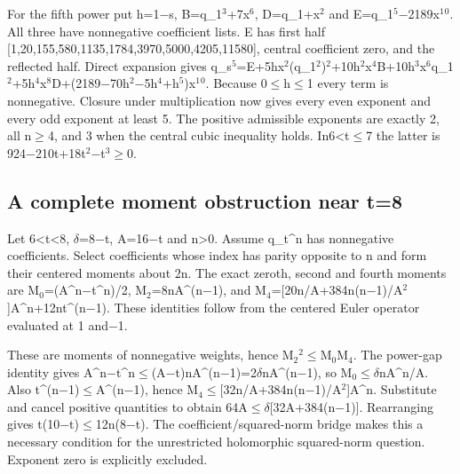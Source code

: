 \documentclass[11pt,a4paper]{article}
\begin{document}
For the fifth power put h=1\ensuremath{-}s, B=q\_1\ensuremath{^3}+7x\ensuremath{^6}, D=q\_1+x\ensuremath{^2} and E=q\_1\ensuremath{^5}\ensuremath{-}2189x\ensuremath{^1}\ensuremath{^0}. All three have nonnegative coefficient lists. E has first half [1,20,155,580,1135,1784,3970,5000,4205,11580], central coefficient zero, and the reflected half. Direct expansion gives q\_s\ensuremath{^5}=E+5hx\ensuremath{^2}(q\_1\ensuremath{^2})\ensuremath{^2}+10h\ensuremath{^2}x\ensuremath{^4}B+10h\ensuremath{^3}x\ensuremath{^6}q\_1\ensuremath{^2}+5h\ensuremath{^4}x\ensuremath{^8}D+(2189\ensuremath{-}70h\ensuremath{^2}\ensuremath{-}5h\ensuremath{^4}+h\ensuremath{^5})x\ensuremath{^1}\ensuremath{^0}. Because 0\ensuremath{\leq}h\ensuremath{\leq}1 every term is nonnegative. Closure under multiplication now gives every even exponent and every odd exponent at least 5. The positive admissible exponents are exactly 2, all n\ensuremath{\geq}4, and 3 when the central cubic inequality holds. In6<t\ensuremath{\leq}7 the latter is 924\ensuremath{-}210t+18t\ensuremath{^2}\ensuremath{-}t\ensuremath{^3}\ensuremath{\geq}0.

\subsection{A complete moment obstruction near t=8}
Let 6<t<8, \ensuremath{\delta}=8\ensuremath{-}t, A=16\ensuremath{-}t and n>0. Assume q\_t\textasciicircum{}n has nonnegative coefficients. Select coefficients whose index has parity opposite to n and form their centered moments about 2n. The exact zeroth, second and fourth moments are M\ensuremath{_0}=(A\textasciicircum{}n\ensuremath{-}t\textasciicircum{}n)/2, M\ensuremath{_2}=8nA\textasciicircum{}(n\ensuremath{-}1), and M\ensuremath{_4}=[20n/A+384n(n\ensuremath{-}1)/A\ensuremath{^2}]A\textasciicircum{}n+12nt\textasciicircum{}(n\ensuremath{-}1). These identities follow from the centered Euler operator evaluated at 1 and\ensuremath{-}1.

These are moments of nonnegative weights, hence M\ensuremath{_2}\ensuremath{^2}\ensuremath{\leq}M\ensuremath{_0}M\ensuremath{_4}. The power-gap identity gives A\textasciicircum{}n\ensuremath{-}t\textasciicircum{}n\ensuremath{\leq}(A\ensuremath{-}t)nA\textasciicircum{}(n\ensuremath{-}1)=2\ensuremath{\delta}nA\textasciicircum{}(n\ensuremath{-}1), so M\ensuremath{_0}\ensuremath{\leq}\ensuremath{\delta}nA\textasciicircum{}n/A. Also t\textasciicircum{}(n\ensuremath{-}1)\ensuremath{\leq}A\textasciicircum{}(n\ensuremath{-}1), hence M\ensuremath{_4}\ensuremath{\leq}[32n/A+384n(n\ensuremath{-}1)/A\ensuremath{^2}]A\textasciicircum{}n. Substitute and cancel positive quantities to obtain 64A\ensuremath{\leq}\ensuremath{\delta}[32A+384(n\ensuremath{-}1)]. Rearranging gives t(10\ensuremath{-}t)\ensuremath{\leq}12n(8\ensuremath{-}t). The coefficient/squared-norm bridge makes this a necessary condition for the unrestricted holomorphic squared-norm question. Exponent zero is explicitly excluded.
\end{document}
